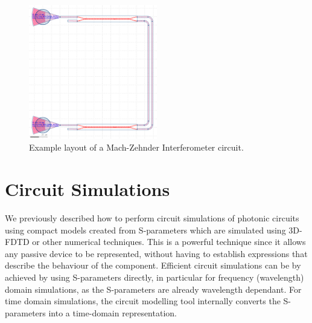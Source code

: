 \documentclass[journal]{spie}
\begin{document}
\begin{figure}[tbp]
	\centering
	\includegraphics[width=0.5\textwidth]{../figs_paper/MZI_circuit2.png}
    \caption[]{Example layout of a Mach-Zehnder Interferometer circuit.}
    \label{MZI_circuit2}
\end{figure}








\section{Circuit Simulations}
\label{sec:circuitsim}
We previously described how to perform circuit simulations of photonic circuits using compact models created from S-parameters which are simulated using 3D-FDTD or other numerical techniques\cite{chrostowski2014design, chrostowski2015silicon}.  This is a powerful technique since it allows any passive device to be represented, without having to establish expressions that describe the behaviour of the component.  Efficient circuit simulations can be by achieved by using S-parameters directly, in particular for frequency (wavelength) domain simulations, as the S-parameters are already wavelength dependant.  For time domain simulations, the circuit modelling tool internally converts the S-parameters into a time-domain representation.  
\end{document}
